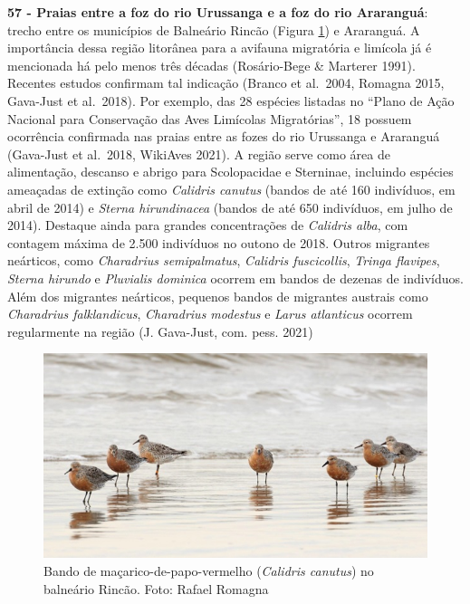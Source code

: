 \documentclass[
  oneside]{scrbook}
\begin{document}
\textbf{57 - Praias entre a foz do rio Urussanga e a foz do rio Araranguá}: trecho entre os municípios de Balneário Rincão (Figura \ref{fig:28}) e Araranguá. A importância dessa região litorânea para a avifauna migratória e limícola já é mencionada há pelo menos três décadas (Rosário-Bege \& Marterer 1991). Recentes estudos confirmam tal indicação (Branco et al.~2004, Romagna 2015, Gava-Just et al.~2018). Por exemplo, das 28 espécies listadas no ``Plano de Ação Nacional para Conservação das Aves Limícolas Migratórias'', 18 possuem ocorrência confirmada nas praias entre as fozes do rio Urussanga e Araranguá (Gava-Just et al.~2018, WikiAves 2021). A região serve como área de alimentação, descanso e abrigo para Scolopacidae e Sterninae, incluindo espécies ameaçadas de extinção como \emph{Calidris canutus} (bandos de até 160 indivíduos, em abril de 2014) e \emph{Sterna hirundinacea} (bandos de até 650 indivíduos, em julho de 2014). Destaque ainda para grandes concentrações de \emph{Calidris alba}, com contagem máxima de 2.500 indivíduos no outono de 2018. Outros migrantes neárticos, como \emph{Charadrius semipalmatus}, \emph{Calidris fuscicollis}, \emph{Tringa flavipes}, \emph{Sterna hirundo} e \emph{Pluvialis dominica} ocorrem em bandos de dezenas de indivíduos. Além dos migrantes neárticos, pequenos bandos de migrantes austrais como \emph{Charadrius falklandicus}, \emph{Charadrius modestus} e \emph{Larus atlanticus} ocorrem regularmente na região (J. Gava-Just, com. pess. 2021)\\

\begin{figure}[H]

{\centering \includegraphics[width=0.75\linewidth]{imagens/cap07/Figura_7.8} 

}

\caption{Bando de maçarico-de-papo-vermelho (\emph{Calidris canutus}) no balneário Rincão. Foto: Rafael Romagna}\label{fig:28}
\end{figure}
\end{document}
